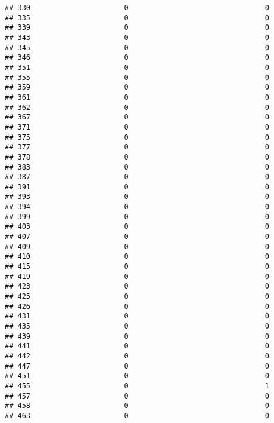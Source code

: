\documentclass[
]{article}
\begin{document}
\begin{verbatim}
## 330                      0                                0
## 335                      0                                0
## 339                      0                                0
## 343                      0                                0
## 345                      0                                0
## 346                      0                                0
## 351                      0                                0
## 355                      0                                0
## 359                      0                                0
## 361                      0                                0
## 362                      0                                0
## 367                      0                                0
## 371                      0                                0
## 375                      0                                0
## 377                      0                                0
## 378                      0                                0
## 383                      0                                0
## 387                      0                                0
## 391                      0                                0
## 393                      0                                0
## 394                      0                                0
## 399                      0                                0
## 403                      0                                0
## 407                      0                                0
## 409                      0                                0
## 410                      0                                0
## 415                      0                                0
## 419                      0                                0
## 423                      0                                0
## 425                      0                                0
## 426                      0                                0
## 431                      0                                0
## 435                      0                                0
## 439                      0                                0
## 441                      0                                0
## 442                      0                                0
## 447                      0                                0
## 451                      0                                0
## 455                      0                                1
## 457                      0                                0
## 458                      0                                0
## 463                      0                                0

\end{verbatim}
\end{document}
